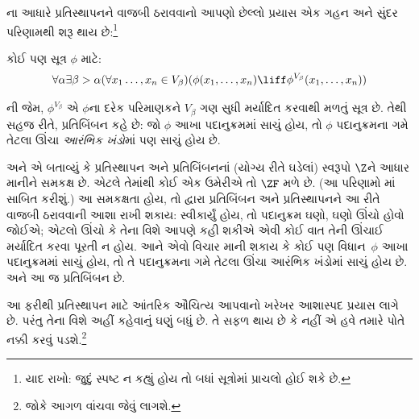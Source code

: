\documentclass[../../../include/open-logic-section]{subfiles}
\begin{document}

\stagesinex{}ના આધારે પ્રતિસ્થાપનને વાજબી ઠરાવવાનો
આપણો છેલ્લો પ્રયાસ એક ગહન અને સુંદર પરિણામથી
શરૂ થાય છે:\footnote{યાદ રાખો: જુદું સ્પષ્ટ ન કહ્યું હોય
તો બધાં સૂત્રોમાં પ્રાચલો હોઈ શકે છે.}
\begin{thm}[પ્રતિબિંબનનું પ્રરૂપ]
કોઈ પણ સૂત્ર $\phi$ માટે:
\[
\forall \alpha \exists \beta > \alpha (\forall x_1 \ldots, x_n \in
V_\beta)(\phi(x_1, \ldots, x_n) \liff \phi^{V_\beta}(x_1, \ldots, x_n))
\]
\end{thm}
\noindent
{}ની જેમ,
$\phi^{V_\beta}$ એ $\phi$ના દરેક પરિમાણકને
$V_\beta$ ગણ સુધી મર્યાદિત કરવાથી મળતું સૂત્ર છે.
તેથી સહજ રીતે, પ્રતિબિંબન કહે છે: જો $\phi$ આખા
પદાનુક્રમમાં સાચું હોય, તો $\phi$ પદાનુક્રમના ગમે તેટલા
ઊંચા \emph{આરંભિક ખંડો}માં પણ સાચું હોય છે.

\citet{Montague1961} અને \citet{Levy1960}એ બતાવ્યું
કે પ્રતિસ્થાપન અને પ્રતિબિંબનનાં (યોગ્ય રીતે ઘડેલાં)
સ્વરૂપો $\Z$ને આધાર માનીને સમકક્ષ છે. એટલે તેમાંથી
કોઈ એક ઉમેરીએ તો $\ZF$ મળે છે. (આ પરિણામો
માં સાબિત કરીશું.)
આ સમકક્ષતા હોય, તો \stagesinex{} દ્વારા પ્રતિબિંબન અને
પ્રતિસ્થાપનને આ રીતે વાજબી ઠરાવવાની આશા રાખી શકાય:
\stagesinex{} સ્વીકાર્યું હોય, તો પદાનુક્રમ ઘણો, ઘણો
ઊંચો હોવો જોઈએ; એટલો ઊંચો કે તેના વિશે આપણે કહી
શકીએ એવી કોઈ વાત તેની ઊંચાઈ મર્યાદિત કરવા પૂરતી ન હોય.
આને એવો વિચાર માની શકાય કે કોઈ પણ વિધાન~$\phi$
આખા પદાનુક્રમમાં સાચું હોય, તો તે પદાનુક્રમના ગમે
તેટલા ઊંચા આરંભિક ખંડોમાં સાચું હોય છે. અને આ જ
પ્રતિબિંબન છે.

આ ફરીથી પ્રતિસ્થાપન માટે આંતરિક ઔચિત્ય આપવાનો
ખરેખર આશાસ્પદ પ્રયાસ લાગે છે. પરંતુ તેના વિશે અહીં
કહેવાનું ઘણું બધું છે. તે સફળ થાય છે કે નહીં એ હવે
તમારે પોતે નક્કી કરવું પડશે.\footnote{જોકે આગળ
\citet[95--100]{Incurvati2020} વાંચવા જેવું લાગશે.}
\end{document}
